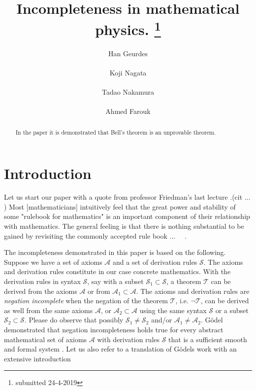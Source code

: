 \documentclass{appolb}
\begin{document}
\title{Incompleteness in mathematical physics.%
\thanks{submitted 24-4-2019}%
}
\author{Han Geurdes
\address{Geurdes data science KvK64522202 CvdLinstraat 164 2593NN Den Haag Netherlands}
\\
{Koji Nagata
}
\address{Department of Physics, Korea Advanced Institute of Science and Technology, Daejeon, Korea }
\\
{Tadao Nakamura
}
\address{Department of Information and Computer Science,  
Keio University, 
3-14-1 Hiyoshi, 
Kohoku-ku,
Yokohama, 
Japan }
\\
{Ahmed Farouk
}
\address{Computer Sciences Department, 
Faculty of Computers and Information, Mansoura University,
Scientific Research Group, Egypt }
}
\maketitle
\begin{abstract}
In the paper it is demonstrated that Bell's theorem is an unprovable theorem.
\end{abstract}
  
\section{Introduction}
Let us start our paper with a quote from professor Friedman's last lecture \cite{FriedLast}.(cit $\dots$) Most [mathematicians] intuitively feel that the great power and stability of some "rulebook for mathematics" is an important component of
their relationship with mathematics. The general
feeling is that there is nothing substantial to be
gained by revisiting the commonly accepted rule book $\dots \quad$ .

The incompleteness demonstrated in this paper is based on the following. Suppose we have a set of axioms $\mathcal{A}$ and a set of derivation rules $\mathcal{S}$.
The axioms and derivation rules constitute in our case concrete mathematics.
With the derivation rules in syntax $\mathcal{S}$, say with a subset $\mathcal{S}_1 \subset \mathcal{S}$, a theorem $\mathcal{T}$ can be derived from the axioms $\mathcal{A}$ or from $\mathcal{A}_1 \subset \mathcal{A}$.
The axioms and derivation rules are \emph{negation incomplete} when the negation of the theorem $\mathcal{T}$, i.e. $\neg\mathcal{T}$, can be derived as well from the same axioms $\mathcal{A}$, or $\mathcal{A}_2 \subset \mathcal{A}$ using the same syntax $\mathcal{S}$ or a subset $\mathcal{S}_2\subset \mathcal{S}$. 
Please do observe that possibly $\mathcal{S}_1\neq \mathcal{S}_2$ and/or $\mathcal{A}_1\neq \mathcal{A}_2$. 
G{\"o}del demonstrated that negation incompleteness holds true for every abstract mathematical set of axioms $\mathcal{A}$ with derivation rules $\mathcal{S}$ that is a sufficient smooth and formal system \cite{YessVolp}. 
Let us also refer to a translation of G{\"o}dels work with an extensive introduction \cite{MeltBrai}
\end{document}
